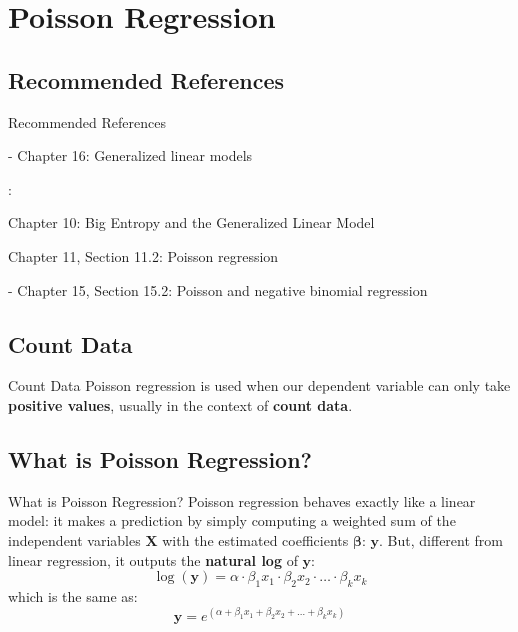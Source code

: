 \section{Poisson Regression}

\subsection{Recommended References}
\begin{frame}{Recommended References}
	\begin{vfilleditems}
		\item \textcite{gelman2013bayesian} - Chapter 16: Generalized linear models
		\item \textcite{mcelreath2020statistical}:
		\begin{vfilleditems}
			\item Chapter 10: Big Entropy and the Generalized Linear Model
			\item Chapter 11, Section 11.2: Poisson regression
		\end{vfilleditems}
		\item \textcite{gelman2020regression} - Chapter 15, Section 15.2: Poisson and negative binomial regression
	\end{vfilleditems}
\end{frame}

\subsection{Count Data}
\begin{frame}{Count Data}
	Poisson regression is used when our dependent variable can only take \textbf{positive values},
	usually in the context of \textbf{count data}.
\end{frame}

\subsection{What is Poisson Regression?}
\begin{frame}{What is Poisson Regression?}
	Poisson regression behaves exactly like a linear model:
	it makes a prediction by simply computing a weighted sum of the
	independent variables $\mathbf{X}$ with the estimated coefficients $\boldsymbol{\beta}$:
	$\mathbf{y}$.
	But, different from linear regression,
	it outputs the \textbf{natural log} of $\mathbf{y}$:
	$$
		\log(\mathbf{y})= \alpha \cdot \beta_1 x_1 \cdot \beta_2 x_2 \cdot \ldots \cdot \beta_k x_k
	$$
	which is the same as:
	$$
		\mathbf{y} = e^{(\alpha + \beta_1 x_1 + \beta_2 x_2 + \ldots + \beta_k x_k)}
	$$
\end{frame}

